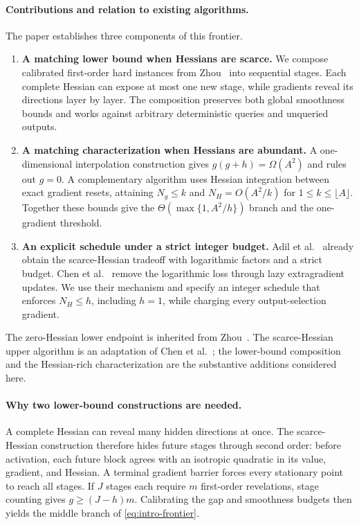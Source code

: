 \documentclass[11pt]{article}
\theoremstyle{remark}
\theoremstyle{remark}
\begin{document}
\paragraph{Contributions and relation to existing algorithms.}
The paper establishes three components of this frontier.
\begin{enumerate}
\item \textbf{A matching lower bound when Hessians are scarce.}
We compose calibrated first-order hard instances from Zhou~\cite{zhou}
into sequential stages. Each complete Hessian can expose at most one
new stage, while gradients reveal its directions layer by layer. The
composition preserves both global smoothness bounds and works against
arbitrary deterministic queries and unqueried outputs.
\item \textbf{A matching characterization when Hessians are abundant.}
A one-dimensional interpolation construction gives
$g(g+h)=\Omega(A^2)$ and rules out $g=0$. A complementary algorithm
uses Hessian integration between exact gradient resets, attaining
$N_g\le k$ and $N_H=O(A^2/k)$ for $1\le k\le\lfloor A\rfloor$. Together these bounds give the
$\Theta(\max\{1,A^2/h\})$ branch and the one-gradient threshold.
\item \textbf{An explicit schedule under a strict integer budget.}
Adil et al.~\cite{adil} already obtain the scarce-Hessian tradeoff with
logarithmic factors and a strict budget. Chen et al.~\cite{chen} remove
the logarithmic loss through lazy extragradient updates. We use their
mechanism and specify an integer schedule that enforces $N_H\le h$,
including $h=1$, while charging every output-selection gradient.
\end{enumerate}
The zero-Hessian lower endpoint is inherited from Zhou~\cite{zhou}.
The scarce-Hessian upper algorithm is an adaptation of Chen et
al.~\cite{chen}; the lower-bound composition and the Hessian-rich
characterization are the substantive additions considered here.

\paragraph{Why two lower-bound constructions are needed.}
A complete Hessian can reveal many hidden directions at once. The
scarce-Hessian construction therefore hides future stages through
second order: before activation, each future block agrees with an
isotropic quadratic in its value, gradient, and Hessian. A terminal
gradient barrier forces every stationary point to reach all stages.
If $J$ stages each require $m$ first-order revelations, stage counting
gives $g\ge(J-h)m$. Calibrating the gap and smoothness budgets then
yields the middle branch of \eqref{eq:intro-frontier}.
\end{document}
